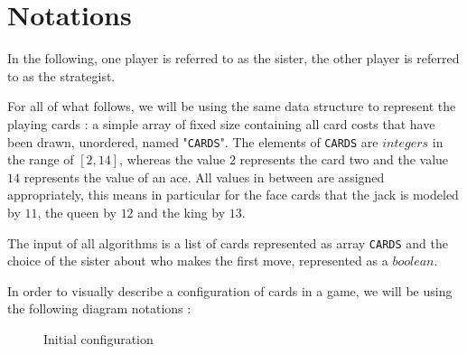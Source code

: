 \documentclass[a4paper,12pt,fleqn]{article}
\begin{document}
\newpage
\section{Notations} \label{sec:notations}

In the following, one player is referred to as the sister, the other player is referred to as the strategist.

For all of what follows, we will be using the same data structure to represent the playing cards : a simple array of fixed size containing all card costs that have been drawn, unordered, named "\texttt{CARDS}". The elements of \texttt{CARDS} are $integers$ in the range of $[2, 14]$, whereas the value $2$ represents the card two and the value $14$ represents the value of an ace. All values in between are assigned appropriately, this means in particular for the face cards that the jack is modeled by $11$, the queen by $12$ and the king by $13$.

The input of all algorithms is a list of cards represented as array \texttt{CARDS} and the choice of the sister about who makes the first move, represented as a $boolean$.

In order to visually describe a configuration of cards in a game, we will be using the following diagram notations :

\begin{figure}[H]
    \centering
    \caption{Initial configuration}
    \label{fig:example_diag_01}
\end{figure}
\end{document}
